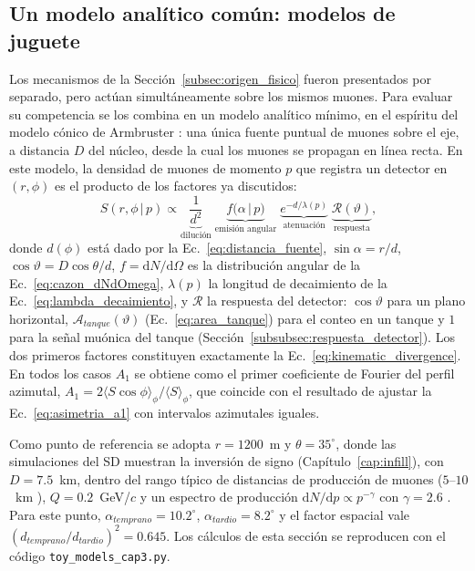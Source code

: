 \subsection{Un modelo analítico común: modelos de juguete}
\label{subsec:toy_models}

Los mecanismos de la Sección~\ref{subsec:origen_fisico} fueron presentados por separado, pero actúan simultáneamente sobre los mismos muones. Para evaluar su competencia se los combina en un modelo analítico mínimo, en el espíritu del modelo cónico de Armbruster \cite{Armbruster2018}: una única fuente puntual de muones sobre el eje, a distancia $D$ del núcleo, desde la cual los muones se propagan en línea recta. En este modelo, la densidad de muones de momento $p$ que registra un detector en $(r,\phi)$ es el producto de los factores ya discutidos:
\begin{equation}
	S(r,\phi\,|\,p) \propto
	\underbrace{\frac{1}{d^2}}_{\text{dilución}}\;
	\underbrace{f\big(\alpha\,|\,p\big)}_{\text{emisión angular}}\;
	\underbrace{e^{-d/\lambda(p)}}_{\text{atenuación}}\;
	\underbrace{\mathcal{R}(\vartheta)}_{\text{respuesta}},
	\label{eq:modelo_juguete}
\end{equation}
donde $d(\phi)$ está dado por la Ec.~\ref{eq:distancia_fuente}, $\sin\alpha = r/d$, $\cos\vartheta = D\cos\theta/d$, $f = \mathrm{d}N/\mathrm{d}\Omega$ es la distribución angular de la Ec.~\ref{eq:cazon_dNdOmega}, $\lambda(p)$ la longitud de decaimiento de la Ec.~\ref{eq:lambda_decaimiento}, y $\mathcal{R}$ la respuesta del detector: $\cos\vartheta$ para un plano horizontal, $\mathcal{A}_{tanque}(\vartheta)$ (Ec.~\ref{eq:area_tanque}) para el conteo en un tanque y $1$ para la señal muónica del tanque (Sección~\ref{subsubsec:respuesta_detector}). Los dos primeros factores constituyen exactamente la Ec.~\ref{eq:kinematic_divergence}. En todos los casos $A_1$ se obtiene como el primer coeficiente de Fourier del perfil azimutal, $A_1 = 2\langle S\cos\phi\rangle_\phi/\langle S\rangle_\phi$, que coincide con el resultado de ajustar la Ec.~\ref{eq:asimetria_a1} con intervalos azimutales iguales.

Como punto de referencia se adopta $r=1200$~m y $\theta=35^\circ$, donde las simulaciones del SD muestran la inversión de signo (Capítulo~\ref{cap:infill}), con $D=7.5$~km, dentro del rango típico de distancias de producción de muones ($5$--$10$~km \cite{Cazon2012, GAP2000_017}), $Q = 0.2$~GeV/$c$ y un espectro de producción $\mathrm{d}N/\mathrm{d}p\propto p^{-\gamma}$ con $\gamma=2.6$ \cite{Cazon2012}. Para este punto, $\alpha_{temprano}=10.2^\circ$, $\alpha_{tardio}=8.2^\circ$ y el factor espacial vale $(d_{temprano}/d_{tardio})^2 = 0.645$. Los cálculos de esta sección se reproducen con el código \texttt{toy\_models\_cap3.py}.

